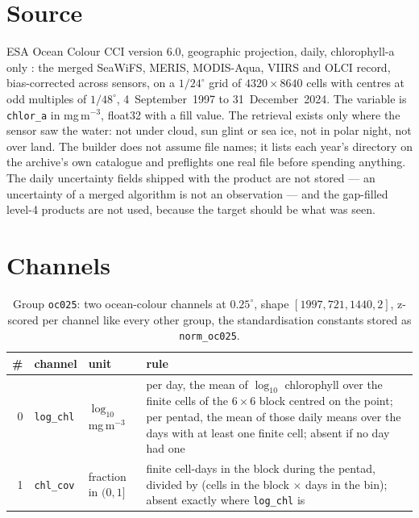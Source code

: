 \documentclass[10pt]{article}
\newcommand{\code}[1]{\texttt{#1}}
\begin{document}
\section{Source}

ESA Ocean Colour CCI version 6.0, geographic projection, daily, chlorophyll-a
only \cite{occci}: the merged SeaWiFS, MERIS, MODIS-Aqua, VIIRS and OLCI
record, bias-corrected across sensors, on a $1/24^\circ$ grid of
$4320 \times 8640$ cells with centres at odd multiples of $1/48^\circ$,
4~September~1997 to 31~December~2024. The variable is \code{chlor\_a} in
mg\,m$^{-3}$, float32 with a fill value. The retrieval exists only where the
sensor saw the water: not under cloud, sun glint or sea ice, not in polar
night, not over land. The builder does not assume file names; it lists each
year's directory on the archive's own catalogue and preflights one real file
before spending anything. The daily uncertainty fields shipped with the
product are not stored --- an uncertainty of a merged algorithm is not an
observation --- and the gap-filled level-4 products are not used, because the
target should be what was seen.

\section{Channels}

\begin{table}[h]
\centering\setlength{\tabcolsep}{4pt}\footnotesize
\begin{tabular}{@{}rl>{\raggedright\arraybackslash}p{2.2cm}>{\raggedright\arraybackslash}p{9.2cm}@{}}
\toprule
\# & channel & unit & rule \\
\midrule
0 & \code{log\_chl} & $\log_{10}$\,mg\,m$^{-3}$ & per day, the mean of $\log_{10}$ chlorophyll over the finite cells of the $6\times6$ block centred on the point; per pentad, the mean of those daily means over the days with at least one finite cell; absent if no day had one \\
1 & \code{chl\_cov} & fraction in $(0, 1]$ & finite cell-days in the block during the pentad, divided by (cells in the block $\times$ days in the bin); absent exactly where \code{log\_chl} is \\
\bottomrule
\end{tabular}
\caption{Group \code{oc025}: two ocean-colour channels at $0.25^\circ$, shape $[1997, 721, 1440, 2]$, z-scored per channel like every other group, the standardisation constants stored as \code{norm\_oc025}.}
\end{table}
\end{document}
